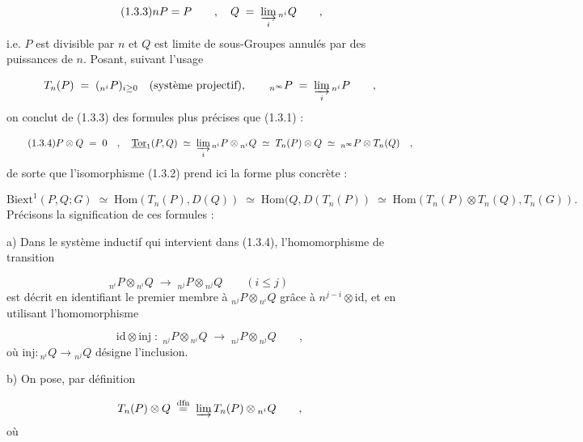 \begin{equation}\tag{1.3.3}
nP=P \qquad , \quad Q \;=\; \varinjlim_i {}_{n^i}Q \qquad ,
\end{equation}
i.e. $P$ est divisible par $n$ et $Q$ est limite de sous-Groupes annulés par des puissances de $n$. Posant, suivant l'usage

\begin{equation*}
T_n(P) \;=\; ({}_{n^i}P)_{i \geq 0} \quad (\text{système projectif}), \qquad {}_{n^\infty}P \;=\; \varinjlim_i {}_{n^i}P \qquad ,
\end{equation*}
on conclut de (1.3.3) des formules plus précises que (1.3.1) :

\begin{equation}\tag{1.3.4}
P \otimes Q \;=\; 0 \quad , \quad \underline{\mathrm{Tor}}_1(P,Q) \;\simeq\; \varinjlim_i {}_{n^i}P \otimes {}_{n^i}Q \;\simeq\; T_n(P) \otimes Q \;\simeq\; {}_{n^\infty}P \otimes T_n(Q) \quad ,
\end{equation}
de sorte que l'isomorphisme (1.3.2) prend ici la forme plus concrète :

\begin{equation}\tag{1.3.5}
\mathrm{Biext}^1(P,Q;G) \;\simeq\; \mathrm{Hom}(T_n(P),D(Q)) \;\simeq\; \mathrm{Hom}(Q,D(T_n(P)) \;\simeq\; \mathrm{Hom}(T_n(P) \otimes T_n(Q),T_n(G)).
\end{equation}
Précisons la signification de ces formules :

a)  Dans le système inductif qui intervient dans (1.3.4), l'homomorphisme de transition

\begin{equation*}
{}_{n^i}P \otimes {}_{n^i}Q \;\longrightarrow\; {}_{n^j}P \otimes {}_{n^j}Q \qquad (i \leq j) \qquad 
\end{equation*}
 est décrit en identifiant le premier membre à ${}_{n^j}P \otimes {}_{n^i}Q$ grâce à $n^{j-i} \otimes \mathrm{id}$, et en utilisant l'homomorphisme

\begin{equation*}
\mathrm{id} \otimes \mathrm{inj} \;:\; {}_{n^j}P \otimes {}_{n^i}Q \;\longrightarrow\; {}_{n^j}P \otimes {}_{n^j}Q \qquad ,
\end{equation*}
où $\mathrm{inj} : {}_{n^i}Q \longrightarrow {}_{n^j}Q$ désigne l'inclusion.

b)  On pose, par définition

\begin{equation*}
T_n(P) \otimes Q \;\overset{\mathrm{dfn}}{=}\; \varinjlim T_n(P) \otimes {}_{n^i}Q \qquad ,
\end{equation*}
où


